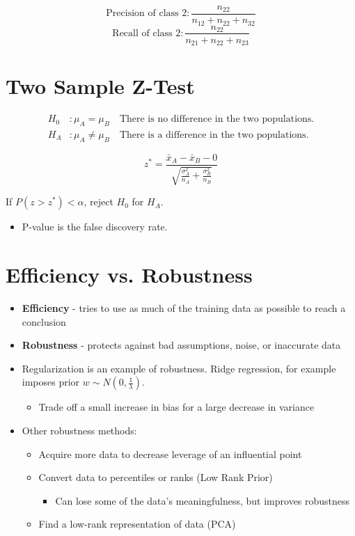 \documentclass{article}
\begin{document}
\[
    \text{Precision of class 2}: \frac{n_{22}}{n_{12} + n_{22} + n_{32}}
\]
\[
    \text{Recall of class 2}: \frac{n_{22}}{n_{21} + n_{22} + n_{23}}
\]

\section{Two Sample Z-Test}
\begin{align*}
    H_0&: \mu_A = \mu_B \quad \text{There is no difference in the two populations.} \\
    H_A&: \mu_A \neq \mu_B \quad \text{There is a difference in the two populations.}
\end{align*}

\[
    z^* = \frac{\bar{x}_A - \bar{x}_B - 0}{\sqrt{\frac{\sigma^2_A}{n_A} + \frac{\sigma^2_B}{n_B}}}
\]

If $P(z > z^*) < \alpha$, reject $H_0$ for $H_A$.
\begin{itemize}
    \item P-value is the false discovery rate.
\end{itemize}

\section{Efficiency vs. Robustness}
\begin{itemize}
    \item \textbf{Efficiency} - tries to use as much of the training data as possible to reach a conclusion
    \item \textbf{Robustness} - protects against bad assumptions, noise, or inaccurate data
    \item Regularization is an example of robustness. Ridge regression, for example imposes prior $w \sim N(0, \frac{1}{\lambda})$.
        \begin{itemize}
            \item Trade off a small increase in bias for a large decrease in variance
        \end{itemize}
    \item Other robustness methods:
        \begin{itemize}
            \item Acquire more data to decrease leverage of an influential point
            \item Convert data to percentiles or ranks (Low Rank Prior)
                \begin{itemize}
                    \item Can lose some of the data's meaningfulness, but improves robustness
                \end{itemize}
            \item Find a low-rank representation of data (PCA)
        \end{itemize}
\end{itemize}
\end{document}
